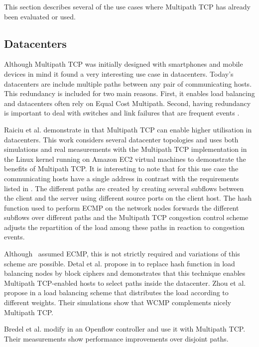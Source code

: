 This section describes several of the use cases where Multipath TCP has already been evaluated or used.

\subsection{Datacenters}

Although Multipath TCP was initially designed with smartphones and mobile devices in mind it found a very interesting use case in datacenters. Today's datacenters are include multiple paths between any pair of communicating hosts. This redundancy is included for two main reasons. First, it enables load balancing and datacenters often rely on Equal Cost Multipath. Second, having redundancy is important to deal with switches and link failures that are frequent events \cite{Zhou_WCMP:2014}.

Raiciu et al. demonstrate in \cite{Raiciu_Datacenter:2011} that Multipath TCP can enable higher utilisation in datacenters. This work considers several datacenter topologies and uses both simulations and real measurements with the Multipath TCP implementation in the Linux kernel running on Amazon EC2 virtual machines to demonstrate the benefits of Multipath TCP. It is interesting to note that for this use case the communicating hosts have a single address in contrast with the requirements listed in \cite{rfc6182}. The different paths are created by creating several subflows between the client and the server using different source ports on the client host. The hash function used to perform ECMP on the network nodes forwards the different subflows over different paths and the Multipath TCP congestion control scheme adjusts the repartition of the load among these paths in reaction to congestion events. 

Although~\cite{Raiciu_Datacenter:2011} assumed ECMP, this is not strictly required and variations of this scheme are possible. Detal et al. propose in \cite{Detal_Revisiting:2013} to replace hash function in load balancing nodes by block ciphers and demonstrates that this technique enables Multipath TCP-enabled hosts to select paths inside the datacenter. Zhou et al. propose in \cite{Zhou_WCMP:2014} a load balancing scheme that distributes the load according to different weights. Their simulations show that WCMP complements nicely Multipath TCP. 


Bredel et al. modify in \cite{Bredel_Flow-based:2014} an Openflow controller and use it with Multipath TCP. Their measurements show performance improvements over disjoint paths.

